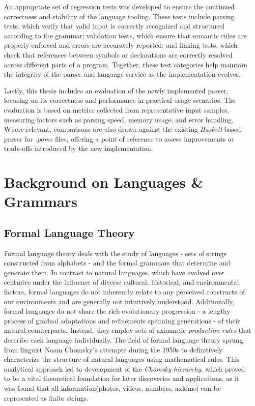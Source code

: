 An appropriate set of regression tests was developed to ensure the continued correctness and stability of the language tooling.
These tests include parsing tests, which verify that valid input is correctly recognized and structured according to the grammar; validation tests,
which ensure that semantic rules are properly enforced and errors are accurately reported; and linking tests, which check that references between symbols
or declarations are correctly resolved across different parts of a program. Together, these test categories help maintain the integrity of the parser and language service as
the implementation evolves.

Lastly, this thesis includes an evaluation of the newly implemented parser, focusing on its correctness and performance in practical usage scenarios.
The evaluation is based on metrics collected from representative input samples, measuring factors such as parsing speed, memory usage, and error handling.
Where relevant, comparisons are also drawn against the existing \textit{Haskell}-based parser for \textit{.pomc} files, offering a point of reference to assess
improvements or trade-offs introduced by the new implementation.

\chapter{Background on Languages \& Grammars}

\label{sec:formallang}
\section{Formal Language Theory}

Formal language theory deals with the study of languages - sets of strings constructed from alphabets - and the formal grammars that determine and generate them.
In contrast to natural languages, which have evolved over centuries under the influence of diverse cultural, historical, and environmental factors,
formal languages do not inherently relate to any perceived constructs of our environments and are generally not intuitively understood.
Additionally, formal languages do not share the rich evolutionary progression - a lengthy process of gradual adaptations and refinements spanning generations -
of their natural counterparts. Instead, they employ sets of axiomatic \textit{production rules} that describe each language individually.
The field of formal language theory sprung from linguist Noam Chomsky's attempts during the 1950s to definitively characterize the structure of natural languages
using mathematical rules.\cite{Jiang_Li_Ravikumar_Regan_2009} This analytical approach led to development of the \textit{Chomsky hierarchy}, which proved
to be a vital theoretical foundation for later discoveries and applications, as it was found that all information(photos, videos, numbers, axioms) can be
represented as finite strings.\\

